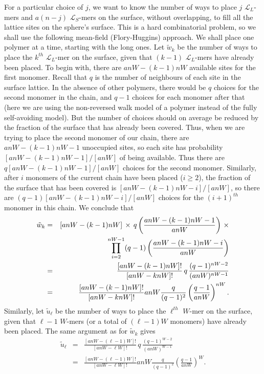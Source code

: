 \documentclass[journal=mamobx,manuscript=article]{achemso}
\newcommand{\leng}{\mathcal{L}}
\begin{document}
For a particular choice of $j$, we want to know the number of ways to place $j$ $\leng_L$-mers 
and $a(n-j)$ $\leng_S$-mers on the surface, without overlapping, to fill all %
the lattice sites on the sphere's surface.
This is a hard combinatorial problem, so we shall use the following mean-field (Flory-Huggins) approach.
We shall place one polymer at a time, starting with the long ones.
Let $\tilde{w}_k$ be the number of ways to place the $k^{th}$ $\leng_L$-mer on the surface, given that
$(k-1)$ $\leng_L$-mers have already been placed.  
To begin with, there are $anW-(k-1)nW$ available sites for the first monomer.  Recall that  $q$ is the number of
neighbours of each site in the surface lattice.
In the absence of other polymers, there would be $q$ choices for the second monomer in the chain,
and $q-1$ choices for each monomer after that (here we are using the non-reversed walk model of a polymer
instead of the fully self-avoiding model).  But the number of choices should on average be reduced 
by the fraction of the surface that has already been covered.  
Thus, when we are trying to place the second monomer of our chain, there are
$anW-(k-1)nW-1$ unoccupied sites, so each site has 
probability $[anW-(k-1)nW-1]/[anW]$ of being available.  
Thus there are $q[anW-(k-1)nW-1]/[anW]$ choices for the second monomer.  
Similarly, after $i$ monomers of the current chain have been placed ($i\geq 2$), the fraction of the
surface that has been covered is $[anW-(k-1)nW-i]/[anW]$, so there are 
$(q-1)[anW-(k-1)nW-i]/[anW]$ choices for the $(i+1)^{th}$ monomer in this chain.  
We conclude that 
\begin{eqnarray}
   \tilde{w}_k  & = &   [anW-(k-1)nW]\,\times \,q\left(\frac{ anW-(k-1)nW-1}{anW}\right)    \,\times
   \nonumber    \\
   & &    \hspace{22mm}
     \prod_{i=2}^{nW-1}(q-1)\left(\frac{ anW-(k-1)nW-i}{anW}\right)  
      \nonumber \\
 & = &    \frac{[anW-(k-1)nW]!}{[anW-knW]!} \,q\,  \frac{(q-1)^{nW-2}}{(anW)^{nW-1}}  
     \nonumber    \\
     & = &    \frac{[anW-(k-1)nW]!}{[anW-knW]!}   anW \frac{q}{(q-1)^2}\left(  \frac{q-1}{anW}\right)^{nW}.
     \label{eq.wk2}
\end{eqnarray}
Similarly, let $\tilde{u}_{\ell}$ be the number of ways to place the $\ell^{th}$ $W$-mer on the surface, given that
${\ell}-1$ $W$-mers (or a total of $(\ell-1)W$ monomers) have already been placed.   The same 
argument as for $\tilde{w}_k$ gives
\begin{eqnarray}
   \tilde{u}_{\ell}  
 & = &    \frac{[anW-(\ell-1)W]!}{[anW-\ell W]!} \,q\,  \frac{(q-1)^{W-2}}{(anW)^{W-1}}  
     \nonumber    \\
     & = &    \frac{[anW-(\ell-1)W]!}{[anW-\ell W]!}   anW \frac{q}{(q-1)^2}\left(  \frac{q-1}{anW}\right)^{W}.
     \label{eq.uell2}
\end{eqnarray}
\end{document}
